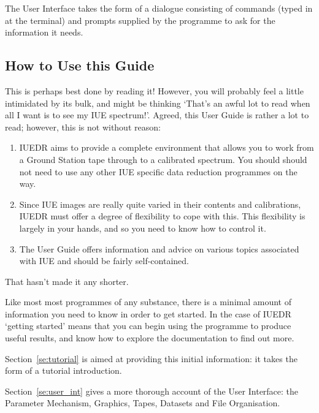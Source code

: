 The User Interface takes the form of a dialogue consisting of commands (typed
in at the terminal) and prompts supplied by the programme to ask for the
information it needs.


\subsection{How to Use this Guide}

This is perhaps best done by reading it! However, you will probably feel a
little intimidated by its bulk, and might be thinking `That's an awful lot to
read when all I want is to see my IUE spectrum!'\@.  Agreed, this User Guide
is rather a lot to read; however, this is not without reason:

\begin{enumerate}

\item IUEDR aims to provide a complete environment that allows you to work
      from a Ground Station tape through to a calibrated spectrum.  You
      should should not need to use any other IUE specific data reduction
      programmes on the way.

\item Since IUE images are really quite varied in their contents and
      calibrations, IUEDR must offer a degree of flexibility to cope with this.
      This flexibility is largely in your hands, and so you need to know how to
      control it.

\item The User Guide offers information and advice on various topics
      associated with IUE and should be fairly self-contained.

\end{enumerate}

That hasn't made it any shorter.

Like most most programmes of any substance, there is a minimal amount of
information you need to know in order to get started.  In the case of IUEDR
`getting started' means that you can begin using the programme to produce
useful results, and know how to explore the documentation to find out
more.

Section~\ref{se:tutorial} is aimed at providing this initial information: it
takes the form of a tutorial introduction.

Section~\ref{se:user_int} gives a more thorough account of the User
Interface: the Parameter Mechanism, Graphics, Tapes, Datasets and File
Organisation.


